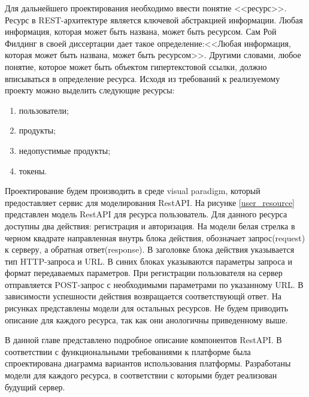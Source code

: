 Для дальнейшего проектирования необходимо ввести понятие <<ресурс>>. Ресурс в REST-архитектуре является ключевой абстракцией информации. Любая информация, которая может быть названа, может быть ресурсом.
Сам Рой Филдинг в своей диссертации дает такое определение:<<Любая информация, которая может быть названа, может быть ресурсом>>. Другими словами, любое понятие, которое может быть объектом гипертекстовой ссылки, должно вписываться в определение ресурса. Исходя из требований к реализуемому проекту можно выделить следующие ресурсы:
\begin{enumerate}
	\item пользователи;
	\item продукты;
	\item недопустимые продукты;
	\item токены.
\end{enumerate}
Проектирование будем производить в среде visual paradigm, который предоставляет сервис для моделирования RestAPI. На рисунке \ref{user_resource} представлен модель RestAPI для ресурса пользователь. Для данного ресурса доступны два действия: регистрация и авторизация. На модели белая стрелка в черном квадрате направленная внутрь блока действия, обозначает запрос(request) к серверу, а обратная ответ(response). В заголовке блока действия указывается тип HTTP-запроса и URL. В синих блоках указываются параметры запроса и формат передаваемых параметров. При регистрации пользователя на сервер отправляется POST-запрос с необходимыми параметрами по указанному URL. В зависимости успешности действия возвращается соответствующй ответ. На рисунках представлены модели для остальных ресурсов. Не будем приводить описание для каждого ресурса, так как они анологичны приведенному выше.

В данной главе представлено подробное описание компонентов RestAPI. В соответствии с функциональными требованиями к платформе
была спроектирована диаграмма вариантов использования платформы.
Разработаны модели для каждого ресурса, в соответствии с которыми будет реализован будущий сервер.

\clearpage